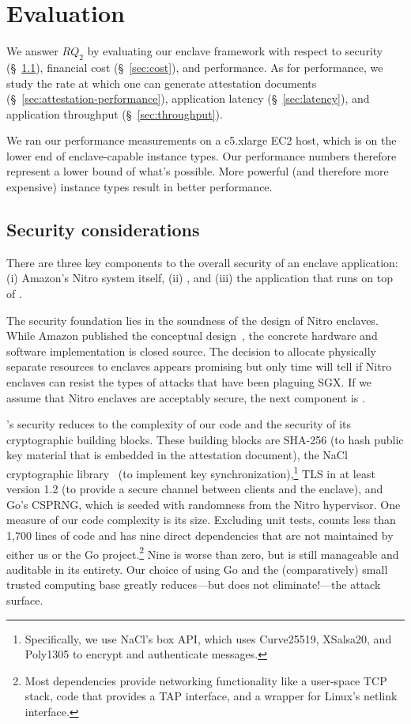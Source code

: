 \section{Evaluation}%
\label{sec:evaluation}

We answer $RQ_2$ by evaluating our enclave framework with respect to
security (\S~\ref{sec:security}),
financial cost (\S~\ref{sec:cost}), and performance.  As for performance, we
study the rate at which one can generate
attestation documents (\S~\ref{sec:attestation-performance}),
application latency (\S~\ref{sec:latency}),
and application throughput (\S~\ref{sec:throughput}).

We ran our performance measurements on a c5.xlarge EC2 host, which is on the
lower end of enclave-capable instance types.  Our performance numbers therefore
represent a lower bound of what's possible.  More powerful (and therefore more
expensive) instance types result in better performance.

\subsection{Security considerations}%
\label{sec:security}

There are three key components to the overall security of an enclave
application:
(i) Amazon's Nitro system itself,
(ii) \tool{}, and
(iii) the application that runs on top of \tool{}.

The security foundation lies in the soundness of the design of Nitro enclaves.
While Amazon published the conceptual design~\cite{Bean2022a}, the concrete
hardware and software implementation is closed source.  The decision to
allocate physically separate resources to enclaves appears promising but only
time will tell if Nitro enclaves can resist the types of attacks that have been
plaguing SGX.  If we assume that Nitro enclaves are acceptably secure, the next
component is \tool{}.

\Tool{}'s security reduces to the complexity of our code and the security of its
cryptographic building blocks.  These building blocks are SHA-256 (to hash
public key material that is embedded in the attestation document), the NaCl
cryptographic library~\cite{nacl} (to implement key
synchronization),\footnote{Specifically, we use NaCl's box API, which uses
Curve25519, XSalsa20, and Poly1305 to encrypt and authenticate messages.} TLS in
at least version 1.2 (to provide a secure channel between clients and the
enclave), and Go's CSPRNG, which is seeded with randomness from the Nitro
hypervisor.
One measure of our code complexity is its size.  Excluding unit tests, \tool{}
counts less than 1,700 lines of code and has nine direct dependencies
that are not maintained by either us or the Go project.\footnote{Most
dependencies provide networking functionality like a user-space TCP stack, code
that provides a TAP interface, and a wrapper for Linux's netlink interface.}
%
Nine is worse than zero, but is still manageable and auditable in its entirety.
Our choice of using Go and the (comparatively) small trusted computing base
greatly reduces---but does not eliminate!---the attack surface.

